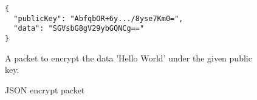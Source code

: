 \begin{figure}[H]
  \centering
  \begin{verbatim}
{
  "publicKey": "AbfqbOR+6y.../8yse7Km0=",
  "data": "SGVsbG8gV29ybGQNCg=="
}
  \end{verbatim}
  \caption{
  	JSON encrypt packet
  }{
  	A packet to encrypt the data 'Hello World' under the given public key.
  }
  \label{code:encrypt_data_json}
\end{figure}
